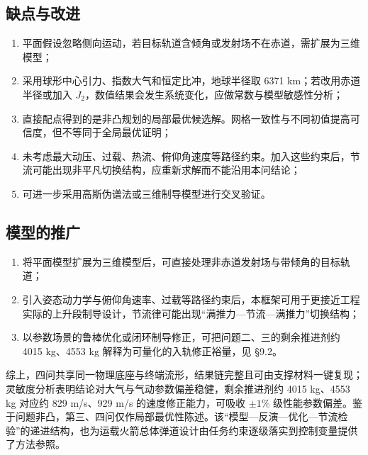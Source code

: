 \documentclass[withoutpreface,bwprint]{cumcmthesis}
\begin{document}
\subsection{缺点与改进}
\begin{enumerate}
    \item 平面假设忽略侧向运动，若目标轨道含倾角或发射场不在赤道，需扩展为三维模型；
    \item 采用球形中心引力、指数大气和恒定比冲，地球半径取 6371 km；若改用赤道半径或加入 $J_2$，数值结果会发生系统变化，应做常数与模型敏感性分析；
    \item 直接配点得到的是非凸规划的局部最优候选解。网格一致性与不同初值提高可信度，但不等同于全局最优证明；
    \item 未考虑最大动压、过载、热流、俯仰角速度等路径约束。加入这些约束后，节流可能出现非平凡切换结构，应重新求解而不能沿用本问结论\cite{nair2022,benedikter2022}；
    \item 可进一步采用高斯伪谱法\cite{liu2019}或三维制导模型\cite{li2023}进行交叉验证。
\end{enumerate}

\subsection{模型的推广}
\begin{enumerate}
    \item 将平面模型扩展为三维模型后，可直接处理非赤道发射场与带倾角的目标轨道；
    \item 引入姿态动力学与俯仰角速率、过载等路径约束后，本框架可用于更接近工程实际的上升段制导设计，节流律可能出现“满推力—节流—满推力”切换结构；
    \item 以参数场景的鲁棒优化或闭环制导修正，可把问题二、三的剩余推进剂约 4015 kg、4553 kg 解释为可量化的入轨修正裕量，见 §9.2。
\end{enumerate}

综上，四问共享同一物理底座与终端流形，结果链完整且可由支撑材料一键复现；灵敏度分析表明结论对大气与气动参数偏差稳健，剩余推进剂约 4015 kg、4553 kg 对应约 829 m/s、929 m/s 的速度修正能力，可吸收 $\pm1\%$ 级性能参数偏差。鉴于问题非凸，第三、四问仅作局部最优性陈述。该“模型—反演—优化—节流检验”的递进结构，也为运载火箭总体弹道设计由任务约束逐级落实到控制变量提供了方法参照\cite{yu2023}。
\end{document}
